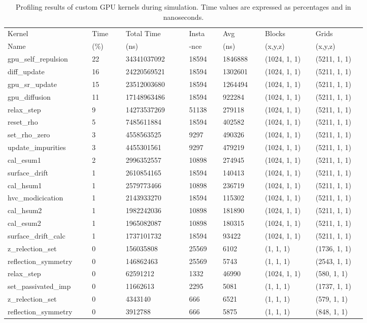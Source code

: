 \begin{table}[!ht]
\centering
\renewcommand{\arraystretch}{1.2} %
\setlength{\tabcolsep}{4pt} %
\begin{tabular}{|p{0.20\linewidth}|p{0.08\linewidth}|p{0.15\linewidth}|p{0.08\linewidth}|p{0.10\linewidth}|p{0.12\linewidth}|p{0.12\linewidth}|}
\hline
Kernel & Time & Total Time & Insta & Avg & Blocks & Grids \\
 Name &  (\%) & (ns) & -nce &  (ns) & (x,y,z) & (x,y,z) \\
\hline
gpu\_self\_repulsion & 22 & 34341037092& 18594& 1846888 & (1024, 1, 1) & (5211, 1, 1) \\
diff\_update & 16 & 24220569521& 18594& 1302601 & (1024, 1, 1) & (5211, 1, 1) \\
gpu\_sr\_update & 15 & 23512003680& 18594& 1264494 & (1024, 1, 1) & (5211, 1, 1) \\
gpu\_diffusion & 11 & 17148963486& 18594& 922284 & (1024, 1, 1) & (5211, 1, 1) \\
relax\_step & 9 & 14273537269& 51138& 279118& (1024, 1, 1) & (5211, 1, 1) \\
reset\_rho & 5& 7485611884& 18594& 402582 & (1024, 1, 1) & (5211, 1, 1) \\
set\_rho\_zero & 3& 4558563525& 9297& 490326 & (1024, 1, 1) & (5211, 1, 1) \\
update\_impurities & 3& 4455301561& 9297& 479219 & (1024, 1, 1) & (5211, 1, 1) \\
cal\_esum1 & 2& 2996352557& 10898& 274945 & (1024, 1, 1) & (5211, 1, 1) \\
surface\_drift & 1 & 2610854165& 18594& 140413 & (1024, 1, 1) & (5211, 1, 1) \\
cal\_hsum1 & 1 & 2579773466& 10898& 236719 & (1024, 1, 1) & (5211, 1, 1) \\
hvc\_modicication & 1 & 2143933270& 18594& 115302 & (1024, 1, 1) & (5211, 1, 1) \\
cal\_hsum2 & 1 & 1982242036& 10898& 181890 & (1024, 1, 1) & (5211, 1, 1) \\
cal\_esum2 & 1 & 1965082087& 10898& 180315 & (1024, 1, 1) & (5211, 1, 1) \\
surface\_drift\_calc & 1 & 1737101732& 18594& 93422 & (1024, 1, 1) & (5211, 1, 1) \\
z\_relection\_set & 0 & 156035808& 25569& 6102 & (1, 1, 1) & (1736, 1, 1) \\
reflection\_symmetry & 0 & 146862463& 25569& 5743 & (1, 1, 1) & (2543, 1, 1) \\
relax\_step & 0& 62591212& 1332& 46990 & (1024, 1, 1) & (580, 1, 1) \\
set\_passivated\_imp & 0& 11662613& 2295& 5081 & (1, 1, 1) & (1737, 1, 1) \\
z\_relection\_set & 0& 4343140& 666& 6521 & (1, 1, 1) & (579, 1, 1) \\
reflection\_symmetry & 0& 3912788& 666& 5875 & (1, 1, 1) & (848, 1, 1) \\
\hline
\end{tabular}
\caption{Profiling results of custom GPU kernels during simulation. Time values are expressed as percentages and in nanoseconds.}
\label{ch4:tab:gpu_kernels}
\end{table}